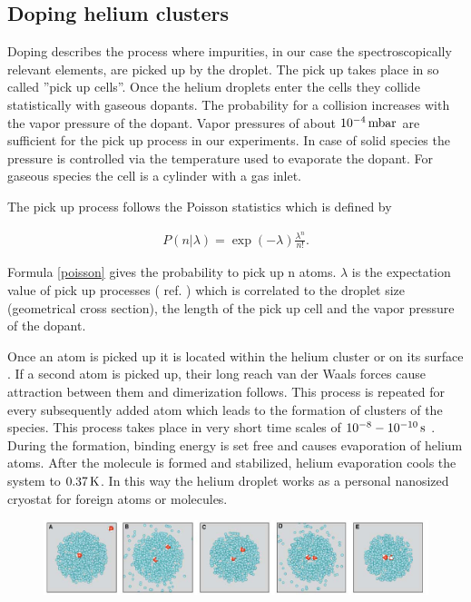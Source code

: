 \documentclass[parskip,12pt,headsepline,a4paper] {scrbook}
\begin{document}
\subsection{Doping helium clusters}
\vspace{-1\baselineskip}
Doping describes the process where impurities, in our case the spectroscopically relevant elements, are picked up by the droplet. The pick up takes place in so called ''pick up cells''. Once the helium droplets enter the cells they collide statistically with gaseous dopants. The probability for a collision increases with the vapor pressure of the dopant. Vapor pressures of about $\unit[10^{-4}]{mbar}$ are sufficient for the pick up process in our experiments. In case of solid species the pressure is controlled via the temperature used to evaporate the dopant. For gaseous species the cell is a cylinder with a gas inlet.

The pick up process follows the Poisson statistics which is defined by

\begin{align}  \label{poisson}
P(n|\lambda) = \exp(-\lambda) \frac{\lambda^n}{n!}.
\end{align}

Formula \ref{poisson} gives the probability to pick up n atoms. $\lambda$ is the expectation value of pick up processes ( ref. \cite{vdl}) which is correlated to the droplet size (geometrical cross section), the length of the pick up cell and the vapor pressure of the dopant.

Once an atom is picked up it is located within the helium cluster or on its surface \cite{pickup-desc}. If a second atom is picked up, their long reach van der Waals forces cause attraction between them and dimerization follows. This process is repeated for every subsequently added atom which leads to the formation of clusters of the species. This process takes place in very short time scales of $\unit[10^{-8} - 10^{-10}]{s}$ \cite{toennis}. During the formation, binding energy is set free and causes evaporation of helium atoms. After the molecule is formed and stabilized, helium evaporation cools the system to $\unit[0.37]{K}$. In this way the helium droplet works as a personal nanosized cryostat for foreign atoms or molecules. \cite{evap-cryo}

\begin{figure}[ht]
\centerline{
\includegraphics[width=13cm]{./doping/doping-helium.jpg}}
\end{figure}
\end{document}
